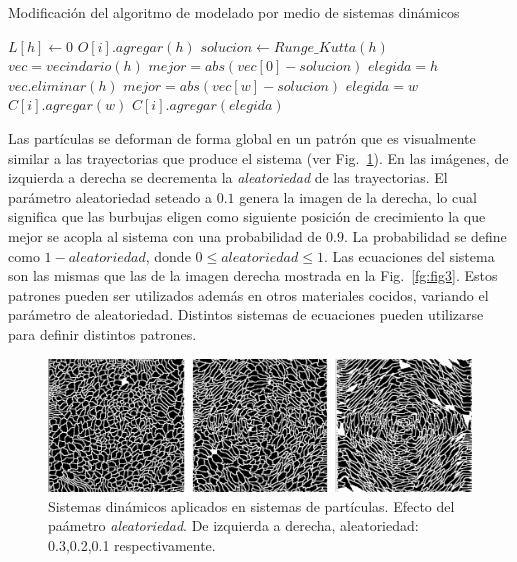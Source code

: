 \documentclass[spanish,a4paper,11pt,oneside,links]{report}
\begin{document}
\begin{algorithm}[h!]
\caption{Modificación del algoritmo de modelado por medio de sistemas dinámicos}
\begin{algorithmic}
\State $L[h]\gets 0$ 
\State $O[i].agregar(h)$
\State $solucion \gets Runge\_Kutta(h)$
\State $vec = vecindario(h)$
\State $mejor = abs(vec[0] - solucion)$
\State $elegida = h$
\State $vec.eliminar(h)$
        \State $mejor = abs(vec[w]-solucion)$
        \State $elegida = w$
    \EndIf
        \State $C[i].agregar(w)$
    \EndIf
\EndFor
{}
\State $C[i].agregar(elegida)$
\end{algorithmic}
\end{algorithm}

Las part\'iculas se deforman de forma global en un patr\'on que es visualmente similar a las trayectorias que produce el sistema (ver Fig.~\ref{fg:sistdin3}). En las im\'agenes, de izquierda a derecha se decrementa la {\em aleatoriedad} de las trayectorias. El par\'ametro aleatoriedad seteado a $0.1$ genera la imagen de la derecha, lo cual significa que las burbujas eligen como siguiente posición de crecimiento la que mejor se acopla al sistema con una probabilidad de $0.9$. La probabilidad se define como $1-aleatoriedad$, donde $0 \leq aleatoriedad \leq 1$. Las ecuaciones del sistema son las mismas que las de la imagen derecha mostrada en la Fig.~\ref{fg:fig3}. Estos patrones pueden ser utilizados adem\'as en otros materiales cocidos, variando el par\'ametro de aleatoriedad. Distintos sistemas de ecuaciones pueden utilizarse para definir distintos patrones.

\begin{figure}[htb!]
  \centerline{\includegraphics[scale=0.21]{sistdin3}}
  \caption{Sistemas din\'amicos aplicados en sistemas de part\'iculas. Efecto del pa\'ametro {\em aleatoriedad}. De izquierda a derecha, aleatoriedad: 0.3,0.2,0.1 respectivamente. }
  \label{fg:sistdin3}
\end{figure}
\end{document}
